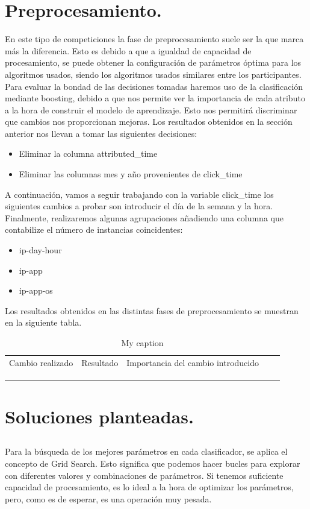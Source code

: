 \section{Preprocesamiento.}
En este tipo de competiciones la fase de preprocesamiento suele ser la que marca más la diferencia. Esto es debido a que a igualdad de capacidad de procesamiento, se puede obtener la configuración de parámetros óptima para los algoritmos usados, siendo los algoritmos usados similares entre los participantes.
\medskip
Para evaluar la bondad de las decisiones tomadas haremos uso de la clasificación mediante boosting, debido a que nos permite ver la importancia de cada atributo a la hora de construir el modelo de aprendizaje. Esto nos permitirá discriminar que cambios nos proporcionan mejoras.
\medskip
Los resultados obtenidos en la sección anterior nos llevan a tomar las siguientes decisiones:
\begin{itemize}
	\item Eliminar la columna attributed\_time
	\item Eliminar las columnas mes y año provenientes de click\_time
\end{itemize}
A continuación, vamos a  seguir trabajando con la variable click\_time los siguientes cambios a probar son introducir el día de la semana y la hora.
Finalmente, realizaremos algunas agrupaciones añadiendo una columna que contabilize el número de instancias coincidentes:
\begin{itemize}
	\item ip-day-hour
	\item ip-app
	\item ip-app-os	
\end{itemize}
Los resultados obtenidos en las distintas fases de preprocesamiento se muestran en la siguiente tabla.
\begin{table}[]
	\centering
	\caption{My caption}
	\label{my-label}
	\begin{tabular}{lllll}
		Cambio realizado& Resultado & Importancia del cambio introducido &  &  \\
		&  &  &  &  \\
		&  &  &  &  \\
		&  &  &  & 
	\end{tabular}
\end{table}
\section{Soluciones planteadas.}
\subsection{}
Para la búsqueda de los mejores parámetros en cada clasificador, se
aplica el concepto de Grid Search. Esto significa que podemos hacer bucles
para explorar con diferentes valores y combinaciones de parámetros. Si
tenemos suficiente capacidad de procesamiento, es lo ideal a la hora de
optimizar los parámetros, pero, como es de esperar, es una operación muy
pesada.
